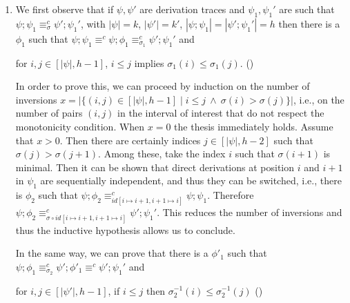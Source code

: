 \documentclass[conference]{IEEEtran}
\renewenvironment{proof}{\begin{IEEEproof}}{\end{IEEEproof}}
\newcommand{\interval}[2][1]{\ensuremath{[{#1},{#2}]}}
\newcommand{\perm}{\sigma}
\begin{document}
\begin{proof}
\begin{enumerate}
\item 
  We first observe that if $\psi, \psi'$ are derivation traces and
  $\psi_1, \psi_1'$ are such that
  $\psi;\psi_1 \equiv^c_{\perm} \psi';\psi_1'$, with $|\psi| = k$, $|\psi'|=k'$, $|\psi;\psi_1| = |\psi';\psi_1'|=h$ then there is
  a $\phi_1$ such that
  $\psi;\psi_1 \equiv^c \psi;\phi_1 \equiv^c_{\perm_1} \psi';\psi_1'$
  and
  \begin{center}
    for $i, j \in \interval[|\psi|]{h-1}$, $i \leq j$ implies
     $\perm_1(i) \leq \perm_1(j)$. \hfill{(\dag)}
  \end{center}
  
  In order to prove this, we can proceed by induction on the number of
  inversions
  $x = |\{ (i, j) \in \interval[|\psi|]{h - 1} \mid i \leq
  j\ \land\ \perm(i) > \perm(j) \}|$, i.e., on the number of pairs
  $(i,j)$ in the interval of interest that do not respect the
  monotonicity condition. When $x=0$ the thesis immediately
  holds. Assume that $x > 0$. Then there are certainly indices
  $j \in \interval[|\psi|]{h-2}$ such that
  $\perm(j) > \perm(j+1)$. Among these, take the index $i$ such that
  $\perm(i+1)$ is minimal. Then it can be shown that direct derivations at 
  position $i$ and
  $i+1$ in $\psi_1$ are sequentially independent,  and thus they can be switched, i.e., there
  is $\phi_2$ such that
  $\psi; \phi_2 \equiv^c_{id[i \mapsto i+1, i+1 \mapsto i]} \psi;
  \psi_1$. Therefore
  $\psi; \phi_2 \equiv^c_{\perm \circ id[i \mapsto i+1, i+1 \mapsto
    i]} \psi'; \psi_1'$. This reduces the number of inversions and thus
  the inductive hypothesis allows us to conclude.
    
  In the same way, we can prove that there is
  a $\phi'_1$ such that
  $\psi;\phi_1 \equiv_{\perm_2}^c \psi';\phi'_1 \equiv^c \psi';\psi_1'$
  and
  \begin{center}
    for $i, j \in \interval[|\psi'|]{h\!-\!1}$, if $i \leq j$ then
     $\perm^{-1}_2(i) \leq \perm^{-1}_2(j)$ {(\ddag)}
  \end{center}
  

\end{enumerate}
\end{proof}
\end{document}
